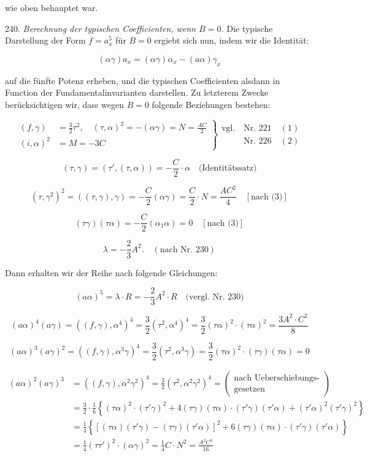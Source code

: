 \documentclass[11pt]{article}
\providecommand{\weberpage}[1]{}
\providecommand{\weq}[2]{\begin{equation}\tag{#1}#2\end{equation}}
\begin{document}
wie oben behauptet war.

240. \textit{Berechnung der typischen Coefficienten, wenn $B=0$.} Die
typische Darstellung der Form $f=a_x^5$ für $B=0$ ergiebt sich nun,
indem wir die Identität:

\[ (\alpha\gamma)a_x=(\alpha\gamma)\alpha_x-(a\alpha)\gamma_x \]

auf die fünfte Potenz erheben, und die typischen Coefficienten alsdann
in Function der Fundamentalinvarianten darstellen. Zu letzterem
Zwecke berücksichtigen wir, dass wegen $B=0$ folgende Beziehungen
bestehen:

\[
\left.\begin{aligned}
(f,\gamma) &= \frac{3}{2}\tau^2, \quad (\tau,\alpha)^2 = -(\alpha\gamma) = N = \frac{AC}{2} \\
(i,\alpha)^2 &= M = -3C
\end{aligned}\right\}
\begin{array}{l} \text{vgl.} \quad \text{Nr. 221} \quad (1) \\ \phantom{\text{vgl.}} \quad \text{Nr. 226} \quad (2) \end{array}
\]

\weq{3}{(\tau,\gamma)=(\tau',(\tau,\alpha))=-\frac{C}{2}\cdot\alpha \quad \text{(Identit\"atssatz)}}

\weq{4}{(\tau,\gamma^2)^2=((\tau,\gamma),\gamma)=-\frac{C}{2}(\alpha\gamma)=\frac{C}{2}\cdot N=\frac{AC^2}{4}\quad[\text{nach (3)}]}

\weq{5}{(\tau\gamma)(\tau\alpha)=-\frac{C}{2}(\alpha_1\alpha)=0\quad[\text{nach (3)}]}

\weq{6}{\lambda=-\frac{2}{3}A^2. \quad (\text{nach Nr. 230})}

Dann erhalten wir der Reihe nach folgende Gleichungen:

\[ (a\alpha)^5=\lambda\cdot R=-\frac{2}{3}A^2\cdot R \quad \text{(vergl. Nr. 230)} \]

\[ (a\alpha)^4(a\gamma) = ((f,\gamma),\alpha^4)^4=\frac{3}{2}(\tau^2,\alpha^4)^4=\frac{3}{2}(\tau\alpha)^2\cdot(\tau\alpha)^2=\frac{3A^2\cdot C^2}{8} \]


\weberpage{266}
\[ (a\alpha)^3(a\gamma)^2=((f,\gamma),\alpha^3\gamma)^4=\frac{3}{2}(\tau^2,\alpha^3\gamma)=\frac{3}{2}(\tau\alpha)^2\cdot(\tau\gamma)(\tau\alpha)=0 \]

\begin{align*}
(a\alpha)^2(a\gamma)^3 &= ((f,\gamma),\alpha^2\gamma^2)^4=\frac{3}{2}(\tau^2,\alpha^2\gamma^2)^4= \begin{pmatrix}\text{nach Ueberschiebungs-}\\ \text{gesetzen}\end{pmatrix}\\
&=\frac{3}{2}\cdot\frac{1}{6}\left\{(\tau\alpha)^2\cdot(\tau'\gamma)^2+4(\tau\gamma)(\tau\alpha)\cdot(\tau'\gamma)(\tau'\alpha)+(\tau'\alpha)^2(\tau'\gamma)^2\right\}\\
&=\frac{1}{4}\left\{[(\tau\alpha)(\tau'\gamma)-(\tau\gamma)(\tau'\alpha)]^2+6(\tau\gamma)(\tau\alpha)\cdot(\tau'\gamma)(\tau'\alpha)\right\}\\
&=\frac{1}{4}(\tau\tau')^2\cdot(\alpha\gamma)^2=\frac{1}{4}C\cdot N^2=\frac{A^2C^3}{16}
\end{align*}
\end{document}
